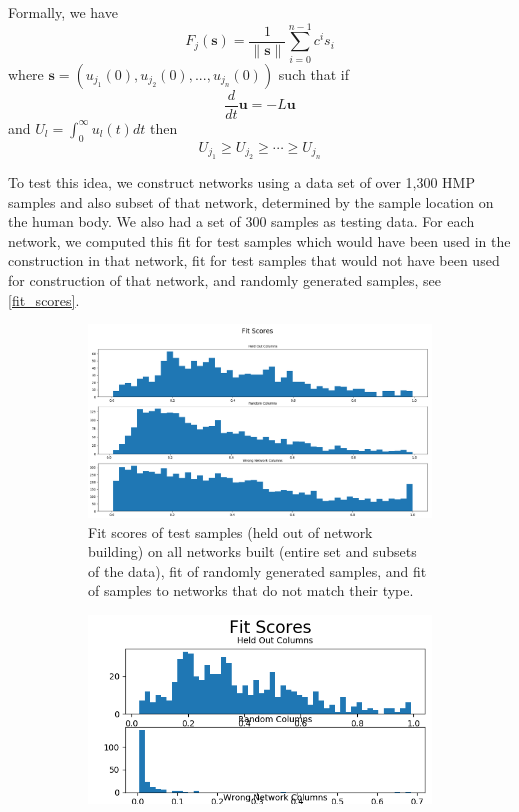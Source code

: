 \documentclass[10pt]{article}
\theoremstyle{definition}
\numberwithin{theorem}{section}
\numberwithin{definition}{section}
\numberwithin{lemma}{section}
\numberwithin{corollary}{section}
\numberwithin{clm}{section}
\numberwithin{rmk}{section}
\renewcommand{\b}{\bm}
\begin{document}
Formally, we have
\[
F_j(\b{s}) =\frac{1}{\|\b{s}\|} \sum_{i=0}^{n-1} c^i s_i
\]
where $\b{s} = (u_{j_1}(0),u_{j_2}(0),...,u_{j_n}(0))$ such that if 
\[
\frac{d}{dt}\b{u} = -L\b{u}
\]
and $U_l = \int_0^{\infty} u_l(t) dt$ then
\[
U_{j_1} \geq U_{j_2} \geq \cdots \geq U_{j_n}
\]

To test this idea, we construct networks using a data set of over 1,300 HMP samples and also subset of that network, determined by the sample location on the human body. We also had a set of 300 samples as testing data. For each network, we computed this fit for test samples which would have been used in the construction in that network, fit for test samples that would not have been used for construction of that network, and randomly generated samples, see \cref{fit_scores}.

\begin{figure}
	\begin{subfigure}{\textwidth}
	\begin{center}
	\includegraphics[scale = 0.4]{../stat_figs/merged2/species_fits_m2.png}
\end{center}
\caption{Fit scores of test samples (held out of network building) on all networks built (entire set and subsets of the data), fit of randomly generated samples, and fit of samples to networks that do not match their type.}
	\end{subfigure}
	\begin{subfigure}{\textwidth}
	\begin{center}
		\includegraphics[scale = 0.8]{../stat_figs/merged2/species_fits_full.png}

\end{center}
\end{subfigure}
\end{figure}
\end{document}
